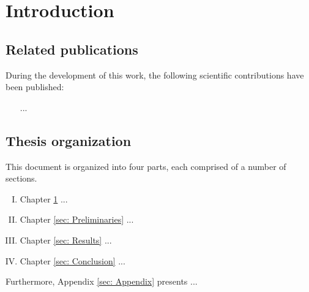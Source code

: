 \chapter{Introduction} \label{sec: Introduction}

\lipsum[1-2][4-8]

\section{Related publications} \label{sec: Introduction_Related_Publications}

During the development of this work, the following scientific contributions have been published:

\begin{itemize}
    \item [...]
\end{itemize}

\section{Thesis organization} \label{sec: Introduction_Thesis_Organization}

This document is organized into four parts, each comprised of a number of sections. 
\begin{enumerate}[I.]
    \item Chapter \ref{sec: Introduction} ... 
    \item Chapter \ref{sec: Preliminaries} ... 
    \item Chapter \ref{sec: Results} ... 
    \item Chapter \ref{sec: Conclusion} ... 
\end{enumerate}

Furthermore, Appendix \ref{sec: Appendix} presents ... 

